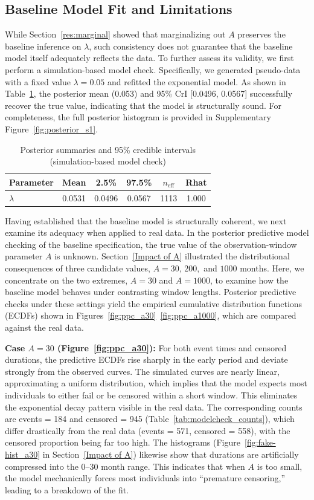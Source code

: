 \subsection{Baseline Model Fit and Limitations}
\label{res:baseline_ecdf}
While Section~\ref{res:marginal} showed that marginalizing out $A$ preserves the baseline inference on $\lambda$, such consistency does not guarantee that the baseline model itself adequately reflects the data. To further assess its validity, we first perform a simulation-based model check. Specifically, we generated pseudo-data with a fixed value $\lambda=0.05$ and refitted the exponential model. As shown in Table~\ref{tab:post-ci}, the posterior mean (0.053) and 95\% CrI [0.0496, 0.0567] successfully recover the true value, indicating that the model is structurally sound. For completeness, the full posterior histogram is provided in Supplementary Figure~\ref{fig:posterior_s1}.
\begin{table}[H]
\centering
\caption{{\small Posterior summaries and 95\% credible intervals (simulation-based model check)}}
\label{tab:post-ci}
\small
\begin{tabular}{lccccc}
\toprule
{Parameter} & {Mean} & {2.5\%} & {97.5\%} & {$n_{\text{eff}}$} & {Rhat} \\
\midrule
$\lambda$   & 0.0531 & 0.0496 & 0.0567 & 1113 & 1.000 \\
\bottomrule
\end{tabular}
\end{table}
Having established that the baseline model is structurally coherent, we next examine its adequacy when applied to real data. In the posterior predictive model checking of the baseline specification, the true value of the observation-window parameter $A$ is unknown. Section~\ref{Impact of A} illustrated the distributional consequences of three candidate values, $A=30, \,200,$ and $1000$ months. Here, we concentrate on the two extremes, $A=30$ and $A=1000$, to examine how the baseline model behaves under contrasting window lengths. Posterior predictive checks under these settings yield the empirical cumulative distribution functions (ECDFs) shown in Figures~\ref{fig:ppc_a30}~\ref{fig:ppc_a1000}, which are compared against the real data.

\textbf{Case $A=30$ (Figure~\ref{fig:ppc_a30}):} For both event times and censored durations, the predictive ECDFs rise sharply in the early period and deviate strongly from the observed curves. The simulated curves are nearly linear, approximating a uniform distribution, which implies that the model expects most individuals to either fail or be censored within a short window. This eliminates the exponential decay pattern visible in the real data. The corresponding counts are events = 184 and censored = 945 (Table~\ref{tab:modelcheck_counts}), which differ drastically from the real data (events = 571, censored = 558), with the censored proportion being far too high. The histograms (Figure~\ref{fig:fake-hist_a30} in Section~\ref{Impact of A}) likewise show that durations are artificially compressed into the 0–30 month range. This indicates that when $A$ is too small, the model mechanically forces most individuals into “premature censoring,” leading to a breakdown of the fit.

